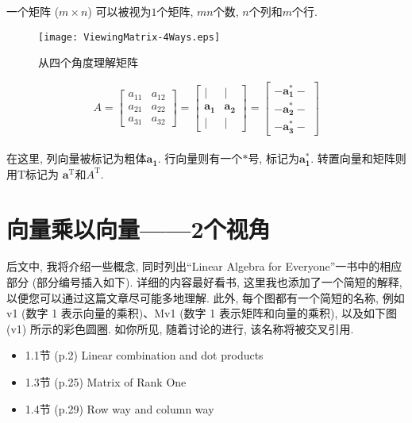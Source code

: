 \documentclass[letterpaper]{article}
\DeclareRobustCommand\transp{^{\mathrm{T}}}
\begin{document}
一个矩阵 ($m \times n$) 可以被视为$1$个矩阵, $mn$个数, $n$个列和$m$个行.

\begin{figure}[H]
  \centering
  \texttt{[image: ViewingMatrix-4Ways.eps]}\\
    \caption{从四个角度理解矩阵}
\end{figure}


\begin{equation*}
  A= \begin{bmatrix}
    a_{11} & a_{12}\\
    a_{21} & a_{22}\\
    a_{31} & a_{32}
  \end{bmatrix}
  =
  \begin{bmatrix}
    | & |\\
    \bm{a_1} & \bm{a_2}\\
    | & |
  \end{bmatrix}
  =
  \begin{bmatrix}
    - \bm{a_1^*} -\\
    - \bm{a_2^*} -\\
    - \bm{a_3^*} -
  \end{bmatrix}
\end{equation*} \\

在这里, 列向量被标记为粗体$\bm{a_1}$.
行向量则有一个$\bm{*}$号, 标记为$\bm{a_1^*}$.
转置向量和矩阵则用$\mathrm{T}$标记为
$\bm{a}\transp$和$A\transp$.

\section{向量乘以向量——2个视角}

后文中, 我将介绍一些概念, 同时列出“Linear Algebra for Everyone”一书中的相应部分 (部分编号插入如下). 
详细的内容最好看书, 这里我也添加了一个简短的解释, 以便您可以通过这篇文章尽可能多地理解. 
此外, 每个图都有一个简短的名称, 例如 v1 (数字 1 表示向量的乘积)、Mv1 (数字 1 表示矩阵和向量的乘积), 以及如下图 (v1) 所示的彩色圆圈. 
如你所见, 随着讨论的进行, 该名称将被交叉引用. 

\begin{itemize}
  \item 1.1节 (p.2) Linear combination and dot products
  \item 1.3节 (p.25) Matrix of Rank One
  \item 1.4节 (p.29) Row way and column way
\end{itemize}
\end{document}
